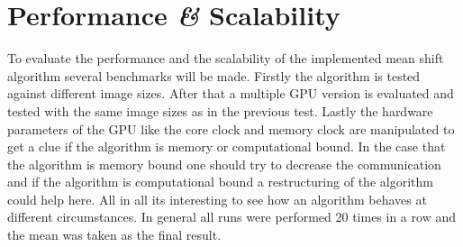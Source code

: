 \chapter{Performance {\itshape{\&}} Scalability} %
\label{cha:performance_and_scalability_}

To evaluate the performance and the scalability of the implemented mean shift
algorithm several benchmarks will be made. Firstly the algorithm is tested 
against different image sizes. After that a multiple \gls{GPU} version is 
evaluated and tested with the same image sizes as in the previous test. Lastly
the hardware parameters of the \gls{GPU} like the core clock and memory clock
are manipulated to get a clue if the algorithm is memory or computational bound. 
In the case that the algorithm is memory bound one should try to decrease the
communication and if the algorithm is computational bound a restructuring of 
the algorithm could help here. All in all its interesting to see how an algorithm
behaves at different circumstances. In general all runs were performed 20 times
in a row and the mean was taken as the final result.

